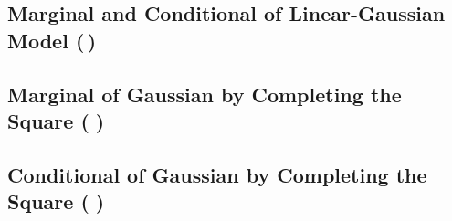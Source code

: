 \documentclass[11pt, a4paper]{scrartcl}
\newcommand{\transposed}{{\!\top\!}}
\renewcommand{\vec}[1]{\bm{#1}}
\newcommand{\mat}[1]{\bm{\mathrm{#1}}}
\newcommand{\diffstar}{\texorpdfstring{\raisebox{-1pt}{\resizebox{!}{8pt}{\(\star\)}}}{*}}
\newcommand{\twostar}  {(\diffstar\,\diffstar)}
\newcommand{\threestar}{(\diffstar\,\diffstar\,\diffstar)}
\begin{document}
		\subsection{Marginal and Conditional of Linear-Gaussian Model  \twostar}

		\subsection{Marginal of Gaussian by Completing the Square  \threestar}


		\subsection{Conditional of Gaussian by Completing the Square  \threestar}
\end{document}
